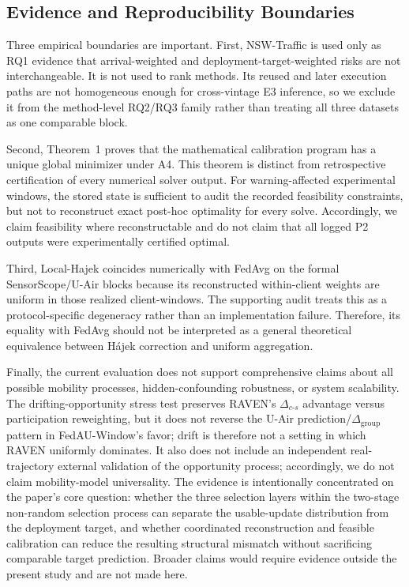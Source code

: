 \documentclass[letterpaper,journal]{IEEEtran}
\begin{document}
\subsection{Evidence and Reproducibility Boundaries}
\label{subsec:discussion_evidence_limits}

Three empirical boundaries are important.  First, NSW-Traffic is used only as
RQ1 evidence that arrival-weighted and deployment-target-weighted risks are not
interchangeable.  It is not used to rank methods.  Its reused and later
execution paths are not homogeneous enough for cross-vintage E3 inference, so
we exclude it from the method-level RQ2/RQ3 family rather than treating all
three datasets as one comparable block.

Second, Theorem~1 proves that the mathematical calibration program has a unique
global minimizer under A4.  This theorem is distinct from retrospective
certification of every numerical solver output.  For warning-affected
experimental windows, the stored state is sufficient to audit the recorded
feasibility constraints, but not to reconstruct exact post-hoc optimality for
every solve.  Accordingly, we claim feasibility where reconstructable and do
not claim that all logged P2 outputs were experimentally certified optimal.

Third, Local-Hajek coincides numerically with FedAvg on the formal
SensorScope/U-Air blocks because its reconstructed within-client weights are
uniform in those realized client-windows.  The supporting audit treats this as
a protocol-specific degeneracy rather than an implementation failure.
Therefore, its equality with FedAvg should not be interpreted as a general
theoretical equivalence between H\'ajek correction and uniform aggregation.

Finally, the current evaluation does not support comprehensive claims about all
possible mobility processes, hidden-confounding robustness, or system
scalability.  The drifting-opportunity stress test preserves RAVEN's
$\Delta_{c\text{-}s}$ advantage versus participation reweighting, but it does
not reverse the U-Air prediction/$\Delta_{\mathrm{group}}$ pattern in
FedAU-Window's favor; drift is therefore not a setting in which RAVEN
uniformly dominates.  It also does not include an independent real-trajectory external
validation of the opportunity process; accordingly, we do not claim
mobility-model universality.  The evidence is intentionally concentrated on the paper's core
question: whether the three selection layers within the two-stage
non-random selection process can separate the usable-update distribution from
the deployment target, and whether coordinated
reconstruction and feasible calibration can reduce the resulting structural
mismatch without sacrificing comparable target prediction.  Broader claims
would require evidence outside the present study and are not made here.
\end{document}
